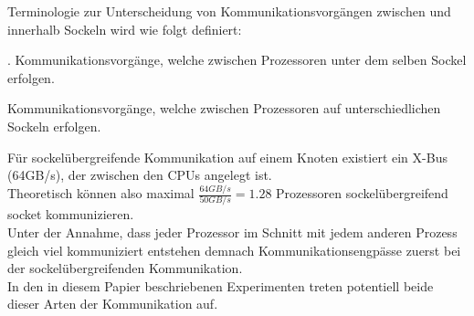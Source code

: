 Terminologie zur Unterscheidung von Kommunikationsvorgängen zwischen und innerhalb Sockeln wird wie folgt definiert:\\
\begin{defi}.
Kommunikationsvorgänge, welche zwischen Prozessoren unter dem selben Sockel erfolgen.
\end{defi}
\begin{defi}
Kommunikationsvorgänge, welche zwischen Prozessoren auf unterschiedlichen Sockeln erfolgen.
\end{defi}
Für sockelübergreifende Kommunikation auf einem Knoten existiert ein X-Bus (64GB/s), der zwischen den CPUs angelegt ist.\\
Theoretisch können also maximal $\frac{64GB/s}{50GB/s} = 1.28$ Prozessoren sockelübergreifend socket kommunizieren.\\
Unter der Annahme, dass jeder Prozessor im Schnitt mit jedem anderen Prozess gleich viel kommuniziert  entstehen demnach Kommunikationsengpässe zuerst bei der sockelübergreifenden Kommunikation.\\
In den in diesem Papier beschriebenen Experimenten treten potentiell beide dieser Arten der Kommunikation auf.

